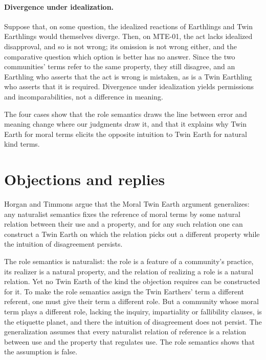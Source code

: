 \documentclass{situationist-preprint}
\begin{document}
\paragraph{Divergence under idealization.} Suppose that, on some question, the idealized reactions of Earthlings and Twin Earthlings would themselves diverge. Then, on MTE-01, the act lacks idealized disapproval, and so is not wrong; its omission is not wrong either, and the comparative question which option is better has no answer. Since the two communities' terms refer to the same property, they still disagree, and an Earthling who asserts that the act is wrong is mistaken, as is a Twin Earthling who asserts that it is required. Divergence under idealization yields permissions and incomparabilities, not a difference in meaning.

The four cases show that the role semantics draws the line between error and meaning change where our judgments draw it, and that it explains why Twin Earth for moral terms elicits the opposite intuition to Twin Earth for natural kind terms.

\section{Objections and replies}

\begin{objection}[Generalization]
Horgan and Timmons argue that the Moral Twin Earth argument generalizes: any naturalist semantics fixes the reference of moral terms by some natural relation between their use and a property, and for any such relation one can construct a Twin Earth on which the relation picks out a different property while the intuition of disagreement persists.
\end{objection}

\begin{reply}
The role semantics is naturalist: the role is a feature of a community's practice, its realizer is a natural property, and the relation of realizing a role is a natural relation. Yet no Twin Earth of the kind the objection requires can be constructed for it. To make the role semantics assign the Twin Earthers' term a different referent, one must give their term a different role. But a community whose moral term plays a different role, lacking the inquiry, impartiality or fallibility clauses, is the etiquette planet, and there the intuition of disagreement does not persist. The generalization assumes that every naturalist relation of reference is a relation between use and the property that regulates use. The role semantics shows that the assumption is false.
\end{reply}
\end{document}
